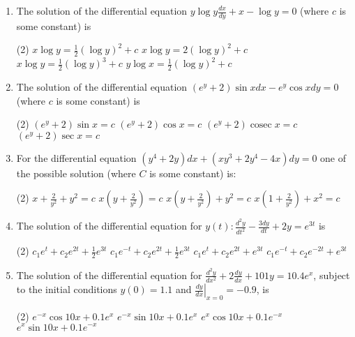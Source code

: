 \begin{enumerate}
\begin{tasks}
	\end{tasks}
	\item The solution of the differential equation
	$y \log y \frac{d x}{d y}+x-\log y=0$ (where $c$ is some constant) is
	 \begin{tasks}(2)
		\task[\textbf{a.}]$x \log y=\frac{1}{2}(\log y)^{2}+c$
		\task[\textbf{b.}] $x \log y=2(\log y)^{2}+c$
		\task[\textbf{c.}]$x \log y=\frac{1}{2}(\log y)^{3}+c$
		\task[\textbf{d.}]  $y \log x=\frac{1}{2}(\log y)^{2}+c$
	\end{tasks}
	\item The solution of the differential equation
	$\left(e^{y}+2\right) \sin x d x-e^{y} \cos x d y=0$ (where $c$ is some constant) is
	 \begin{tasks}(2)
		\task[\textbf{a.}]$\left(e^{y}+2\right) \sin x=c$
		\task[\textbf{b.}] $\left(e^{y}+2\right) \cos x=c$
		\task[\textbf{c.}] $\left(e^{y}+2\right) \operatorname{cosec} x=c$
		\task[\textbf{d.}] $\left(e^{y}+2\right) \sec x=c$
	\end{tasks}
	\item For the differential equation $\left(y^{4}+2 y\right) d x+\left(x y^{3}+2 y^{4}-4 x\right) d y=0$ one of the possible solution (where $C$ is some constant) is:
	 \begin{tasks}(2)
		\task[\textbf{a.}]$x+\frac{2}{y^{2}}+y^{2}=c$
		\task[\textbf{b.}] $x\left(y+\frac{2}{y^{2}}\right)=c$
		\task[\textbf{c.}]$x\left(y+\frac{2}{y^{2}}\right)+y^{2}=c$
		\task[\textbf{d.}] $x\left(1+\frac{2}{y^{2}}\right)+x^{2}=c$
	\end{tasks}
	\item The solution of the differential equation for $y(t): \frac{d^{2} y}{d t^{2}}-\frac{3 d y}{d t}+2 y=e^{3 t}$ is
	 \begin{tasks}(2)
		\task[\textbf{a.}] $c_{1} e^{t}+c_{2} e^{2 t}+\frac{1}{2} e^{3 t}$
		\task[\textbf{b.}]$c_{1} e^{-t}+c_{2} e^{2 t}+\frac{1}{2} e^{3 t}$
		\task[\textbf{c.}]$c_{1} e^{t}+c_{2} e^{2 t}+e^{3 t}$
		\task[\textbf{d.}] $c_{1} e^{-t}+c_{2} e^{-2 t}+e^{3 t}$
	\end{tasks}
	\item The solution of the differential equation for $\frac{d^{2} y}{d x^{2}}+2 \frac{d y}{d x}+101 y=10.4 e^{x}$, subject to the initial conditions $y(0)=1.1$ and $\left.\frac{d y}{d x}\right|_{x=0}=-0.9$, is
	 \begin{tasks}(2)
		\task[\textbf{a.}]$e^{-x} \cos 10 x+0.1 e^{x}$
		\task[\textbf{b.}]$e^{-x} \sin 10 x+0.1 e^{x}$
		\task[\textbf{c.}]$e^{x} \cos 10 x+0.1 e^{-x}$
		\task[\textbf{d.}] $e^{x} \sin 10 x+0.1 e^{-x}$

\end{tasks}
\end{enumerate}
